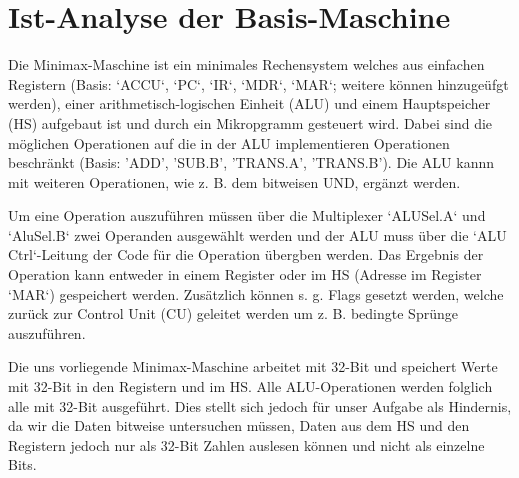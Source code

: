 \documentclass[12pt,titlepage]{article}
\begin{document}
\section{Ist-Analyse der Basis-Maschine}

Die Minimax-Maschine ist ein minimales Rechensystem welches aus einfachen Registern (Basis: `ACCU`, `PC`, `IR`, `MDR`, `MAR`;
weitere können hinzugeüfgt werden), einer arithmetisch-logischen Einheit (ALU) und einem Hauptspeicher (HS) aufgebaut
ist und durch ein Mikropgramm gesteuert wird. Dabei sind die möglichen Operationen auf die in der ALU implementieren
Operationen beschränkt (Basis: 'ADD', 'SUB.B', 'TRANS.A', 'TRANS.B'). Die ALU kannn mit weiteren Operationen,
wie z. B. dem bitweisen UND, ergänzt werden.


Um eine Operation auszuführen müssen über die Multiplexer `ALUSel.A` und `AluSel.B` zwei Operanden ausgewählt werden
und der ALU muss über die `ALU Ctrl`-Leitung der Code für die Operation übergben werden. Das Ergebnis der Operation kann
entweder in einem Register oder im HS (Adresse im Register `MAR`) gespeichert werden. Zusätzlich können s. g. Flags 
gesetzt werden, welche zurück zur Control Unit (CU) geleitet werden um z. B. bedingte Sprünge auszuführen.


Die uns vorliegende Minimax-Maschine arbeitet mit 32-Bit und speichert Werte mit 32-Bit in den Registern und im HS.
Alle ALU-Operationen werden folglich alle mit 32-Bit ausgeführt. Dies stellt sich jedoch für unser Aufgabe als
Hindernis, da wir die Daten bitweise untersuchen müssen, Daten aus dem HS und den Registern jedoch nur als
32-Bit Zahlen auslesen können und nicht als einzelne Bits.
\end{document}
